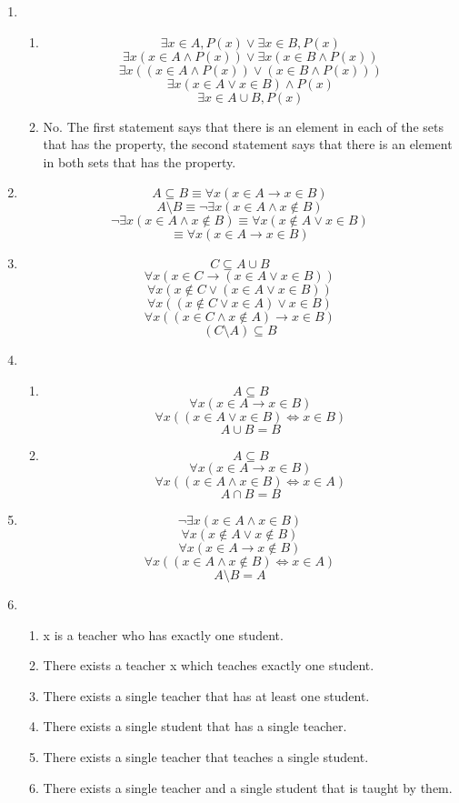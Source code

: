 \begin{enumerate}
    \item
    \begin{enumerate}
        \item 
        \[\exists x \in A, P(x) \lor \exists x \in B, P(x)\]
        \[\exists x (x \in A \land P(x)) \lor \exists x (x \in B \land P(x))\]
        \[\exists x ((x\in A \land P(x)) \lor (x \in B \land P(x)))\]
        \[\exists x (x \in A \lor x \in B) \land P(x)\]
        \[\exists x \in A \cup B, P(x)\]
        \item 
        No. The first statement says that there is an element in each of the sets that has the property, the second statement says that there is an element in both sets that has the property.
    \end{enumerate}
    \item
    \[A \subseteq B \equiv \forall x (x \in A \rightarrow x \in B)\]
    \[A \setminus B \equiv \lnot \exists x (x \in A \land x \notin B)\]
    \[\lnot \exists x (x \in A \land x \notin B) \equiv \forall x (x \notin A \lor x \in B)\]
    \[\equiv \forall x (x \in A \rightarrow x \in B)\]
    \item
    \[C \subseteq A \cup B\]
    \[\forall x (x \in C \rightarrow (x \in A \lor x \in B))\]
    \[\forall x (x \notin C \lor (x \in A \lor x \in B))\]
    \[\forall x ((x \notin C \lor x \in A) \lor x \in B)\]
    \[\forall x ((x \in C \land x \notin A) \rightarrow x \in B)\]
    \[(C \setminus A) \subseteq B\]
    \item
    \begin{enumerate}
        \item 
        \[A \subseteq B\]
        \[\forall x (x \in A \rightarrow x \in B)\]
        \[\forall x ((x \in A \lor x \in B) \iff x \in B)\]
        \[A \cup B = B\]
        \item 
        \[A \subseteq B\]
        \[\forall x (x \in A \rightarrow x \in B)\]
        \[\forall x ((x \in A \land x \in B) \iff x \in A)\]
        \[A \cap B = B\]
    \end{enumerate}
    \item
    \[\lnot \exists x (x \in A \land x \in B)\]
    \[\forall x (x \notin A \lor x \notin B)\]
    \[\forall x (x \in A \rightarrow x \notin B)\]
    \[\forall x ((x \in A \land x \notin B) \iff x \in A)\]
    \[A \setminus B = A\]
    \item 
    \begin{enumerate}
        \item x is a teacher who has exactly one student.
        \item There exists a teacher x which teaches exactly one student.
        \item There exists a single teacher that has at least one student.
        \item There exists a single student that has a single teacher.
        \item There exists a single teacher that teaches a single student.
        \item There exists a single teacher and a single student that is taught by them.
    \end{enumerate}
\end{enumerate}
